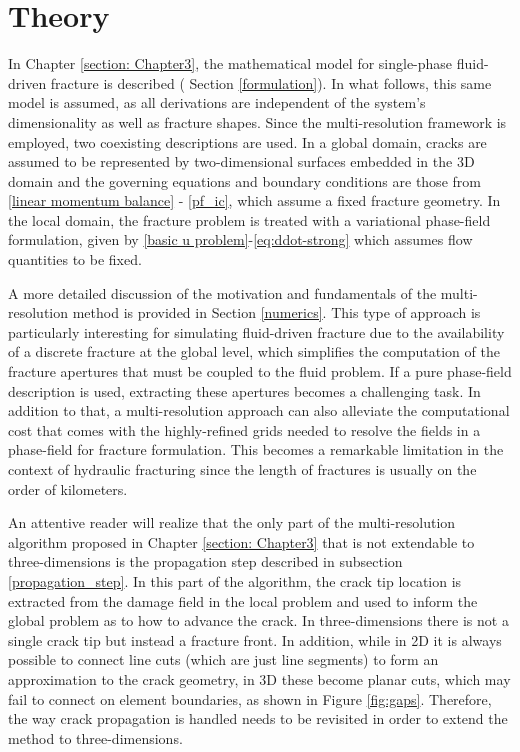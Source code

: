\section{Theory}
\label{section: Chapter4/theory}

In Chapter \ref{section: Chapter3}, the mathematical model for single-phase fluid-driven fracture is described ( Section \ref{formulation}). In what follows, this same model is assumed, as all derivations are independent of the system's dimensionality as well as fracture shapes. Since the multi-resolution framework is employed, two coexisting descriptions are used. In a global domain, cracks are assumed to be represented by two-dimensional surfaces embedded in the 3D domain and the governing equations and boundary conditions are those from \eqref{linear momentum balance} - \eqref{pf_ic}, which assume a fixed fracture geometry. In the local domain, the fracture problem is treated with a variational phase-field formulation, given by \eqref{basic u problem}-\eqref{eq:ddot-strong} which assumes flow quantities to be fixed.

A more detailed discussion of the motivation and fundamentals of the multi-resolution method is provided in Section \ref{numerics}. This type of approach is particularly interesting for simulating fluid-driven fracture due to the availability of a discrete fracture at the global level, which simplifies the computation of the fracture apertures that must be coupled to the fluid problem. If a pure phase-field description is used, extracting these apertures becomes a challenging task. In addition to that, a multi-resolution approach can also alleviate the computational cost that comes with the highly-refined grids needed to resolve the fields in a phase-field for fracture formulation. This becomes a remarkable limitation in the context of hydraulic fracturing since the length of fractures is usually on the order of kilometers.


An attentive reader will realize that the only part of the multi-resolution algorithm proposed in Chapter \ref{section: Chapter3} that is not extendable to three-dimensions is the propagation step described in  subsection \ref{propagation_step}. In this part of the algorithm, the crack tip location is extracted from the damage field in the local problem and used to inform the global problem as to how to advance the crack. In three-dimensions there is not a single crack tip but instead a fracture front. In addition, while in 2D it is always possible to connect line cuts (which are just line segments) to form an approximation to the crack geometry, in 3D these become planar cuts, which may fail to connect on element boundaries, as shown in Figure \ref{fig:gaps}. Therefore, the way crack propagation is handled needs to be revisited in order to extend the method to three-dimensions.

